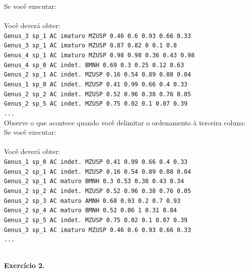 \begin{refsection}
Se você executar:\\
\\

Você deverá obter:\\
\texttt{Genus\_3	sp\_1	AC	imaturo	MZUSP	0.46	0.6	0.93	0.66	0.33}\\
\texttt{Genus\_3	sp\_1	AC	imaturo	MZUSP	0.87	0.82	0	0.1	0.8}\\
\texttt{Genus\_4	sp\_1	AC	imaturo	MZUSP	0.98	0.98	0.36	0.43	0.98}\\
\texttt{Genus\_4	sp\_0	AC	indet.	BMNH	0.69	0.3	0.25	0.12	0.63}\\
\texttt{Genus\_2	sp\_1	AC	indet.	MZUSP	0.16	0.54	0.89	0.08	0.04}\\
\texttt{Genus\_1	sp\_0	AC	indet.	MZUSP	0.41	0.99	0.66	0.4	0.33}\\
\texttt{Genus\_2	sp\_2	AC	indet.	MZUSP	0.52	0.96	0.38	0.76	0.05}\\
\texttt{Genus\_2	sp\_5	AC	indet.	MZUSP	0.75	0.02	0.1	0.07	0.39}\\
\texttt{...}\\

Observe o que acontece quando você delimitar o ordenamento à terceira coluna:\\

Se você executar:\\
\\

Você deverá obter:\\
\texttt{Genus\_1	sp\_0	AC	indet.	MZUSP	0.41	0.99	0.66	0.4	0.33}\\
\texttt{Genus\_2	sp\_1	AC	indet.	MZUSP	0.16	0.54	0.89	0.08	0.04}\\
\texttt{Genus\_2	sp\_1	AC	maturo	BMNH	0.3	0.53	0.38	0.43	0.34}\\
\texttt{Genus\_2	sp\_2	AC	indet.	MZUSP	0.52	0.96	0.38	0.76	0.05}\\
\texttt{Genus\_2	sp\_3	AC	maturo	AMNH	0.68	0.93	0.2	0.7	0.93}\\
\texttt{Genus\_2	sp\_4	AC	maturo	BMNH	0.52	0.06	1	0.31	0.84}\\
\texttt{Genus\_2	sp\_5	AC	indet.	MZUSP	0.75	0.02	0.1	0.07	0.39}\\
\texttt{Genus\_3	sp\_1	AC	imaturo	MZUSP	0.46	0.6	0.93	0.66	0.33}\\
\texttt{...}\\\

\begin{blackBlock}{\textbf{Exercício 2.}}\label{tut2:ex:2.\arabic{ex}}


\end{blackBlock}
\end{refsection}
